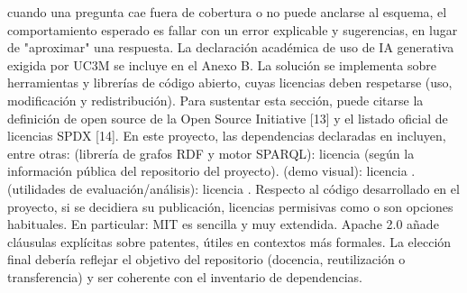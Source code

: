 \markdownRendererUlItem {} cuando una pregunta cae fuera de cobertura o no puede anclarse al esquema, el comportamiento esperado es fallar con un error explicable y sugerencias, en lugar de "aproximar" una respuesta.\markdownRendererUlItemEnd 
\markdownRendererUlEnd \markdownRendererInterblockSeparator
{}\markdownRendererInterblockSeparator
{}La declaración académica de uso de IA generativa exigida por UC3M se incluye en el Anexo B.\markdownRendererInterblockSeparator
{}\markdownRendererInterblockSeparator
{}La solución se implementa sobre herramientas y librerías de código abierto, cuyas licencias deben respetarse (uso, modificación y redistribución). Para sustentar esta sección, puede citarse la definición de open source de la Open Source Initiative [13] y el listado oficial de licencias SPDX [14].\markdownRendererInterblockSeparator
{}En este proyecto, las dependencias declaradas en  incluyen, entre otras:\markdownRendererInterblockSeparator
{}\markdownRendererUlBegin
\markdownRendererUlItem {} (librería de grafos RDF y motor SPARQL): licencia  (según la información pública del repositorio del proyecto).\markdownRendererUlItemEnd 
\markdownRendererUlItem {} (demo visual): licencia .\markdownRendererUlItemEnd 
\markdownRendererUlItem {} (utilidades de evaluación/análisis): licencia .\markdownRendererUlItemEnd 
\markdownRendererUlEnd \markdownRendererInterblockSeparator
{}Respecto al código desarrollado en el proyecto, si se decidiera su publicación, licencias permisivas como  o  son opciones habituales. En particular:\markdownRendererInterblockSeparator
{}\markdownRendererUlBeginTight
\markdownRendererUlItem MIT es sencilla y muy extendida.\markdownRendererUlItemEnd 
\markdownRendererUlItem Apache 2.0 añade cláusulas explícitas sobre patentes, útiles en contextos más formales.\markdownRendererUlItemEnd 
\markdownRendererUlEndTight \markdownRendererInterblockSeparator
{}La elección final debería reflejar el objetivo del repositorio (docencia, reutilización o transferencia) y ser coherente con el inventario de dependencias.\markdownRendererInterblockSeparator
